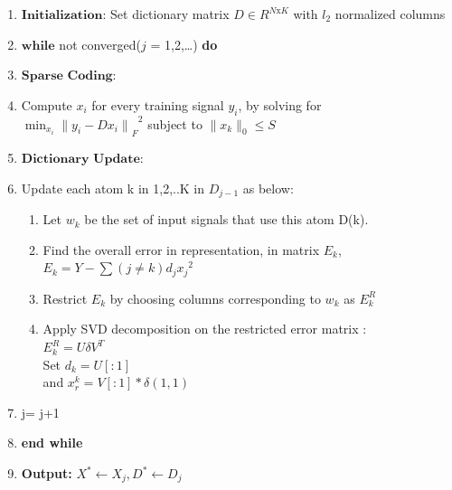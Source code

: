 \documentclass{article} %
\begin{document}
\begin{enumerate}
\item $\textbf{Initialization:}$  Set dictionary matrix $D  \in R^{N\text{x}K}$ with $l_2$ normalized columns
\item $\textbf{while}$ not converged($j$ = 1,2,\ldots) \textbf{do}
\item \hspace*{.4cm} $\textbf{Sparse Coding:}$ 
\item \hspace*{.8cm}Compute $x_i$ for every training signal $y_i$, by solving for\\
\hspace*{.8cm}$\min_{x_i}{{\|y_i-Dx_i\|}_F}^2$ subject to $\|x_k\|_0\leq S$
\item \hspace*{.4cm} $\textbf{Dictionary Update:}$ 
\item \hspace*{.8cm} Update each atom k in {1,2,..K} in $D_{j-1}$ as below:
\begin{enumerate}
\item \hspace*{.8cm} Let $w_k$ be the set of input signals that use this atom D(k).
\item \hspace*{.8cm} Find the overall error in representation, in matrix $E_k$,\\
\hspace*{.8cm} $E_k = Y - \sum(j \neq k){d_j{x_j}^2}$
\item \hspace*{.8cm} Restrict $E_k$ by choosing columns corresponding to $w_k$ as $E_k^R$
\item \hspace*{.8cm} Apply SVD decomposition on the restricted error matrix :\\
\hspace*{.8cm}$E_k^R = U\delta V^T$\\
\hspace*{.8cm}Set $d_k = U[:1]$\\
\hspace*{.8cm}and $x_r^k = V[:1]*\delta(1,1)$
\end{enumerate}
\item \hspace*{.8cm}j= j+1
\item \textbf{end while}
\item \textbf{Output: } $X^{*} \leftarrow X_j, D^{*} \leftarrow D_j$
\end{enumerate}
\end{document}
